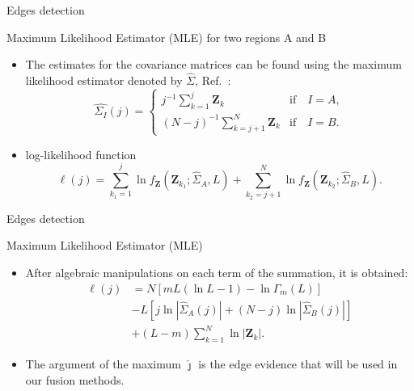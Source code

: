 \documentclass[10pt]{beamer}
\begin{document}
\begin{frame}[fragile]{Edges detection}
\begin{alertblock}{Maximum Likelihood Estimator (MLE) for two regions A and B}
\begin{itemize}
\item The estimates for the covariance matrices can be found using the maximum likelihood estimator denoted by $\widehat{\Sigma}$, Ref.~\cite{good}: 
\begin{equation}
\widehat{\Sigma_{I}}(j) = \left\{
\begin{array}{lc}
	j^{-1}\sum_{k=1}^{j}\mathbf{Z}_{k}  & \mbox{if}\quad I=A,  \\
        (N-j)^{-1}\sum_{k=j+1}^{N}\mathbf{Z}_{k} & \mbox{if}\quad I=B.
\end{array}
\right.\label{eq_08}
\end{equation}
    \item log-likelihood function
\begin{equation}
\ell(j) =
	\sum_{k_1=1}^{j}\ln f_{\mathbf{Z}}(\mathbf{Z}_{k_1}; \widehat\Sigma_{A},L) + \sum_{k_2=j+1}^{N}\ln f_{\mathbf{Z}}(\mathbf{Z}_{k_2}; \widehat\Sigma_{B},L).
	\label{eq_07}
\end{equation}
\end{itemize}
\end{alertblock}
\end{frame}


\begin{frame}[fragile]{Edges detection}
\begin{alertblock}{Maximum Likelihood Estimator (MLE)}
\begin{itemize}
	\item After algebraic manipulations on each term of the summation, it is obtained:
\begin{align}\nonumber
	\ell(j)&=N\left[mL(\ln{L}-1)-\ln{\Gamma_m(L)}\right]\\\nonumber
	&- L\left[j\ln{|\widehat{\Sigma}_{A}(j)|} +(N-j)\ln{|\widehat{\Sigma}_{B}(j)|}\right] \\
	&+ (L-m)\sum_{k=1}^{N}\ln{|\mathbf{Z}_{k}|}.\label{eq_09}
\end{align}

\item The argument of the maximum $\widehat{\jmath}$ is the edge evidence that will be used in our fusion methods.
\end{itemize}
\end{alertblock}
\end{frame}
\end{document}

